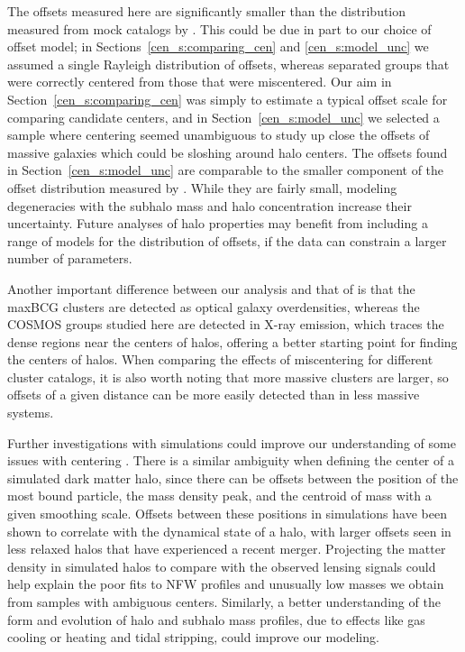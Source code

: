 The offsets measured here are significantly smaller than the
distribution measured from mock catalogs by
\citet{Johnston2007b}. This could be due in part to our choice of
offset model; in Sections~\ref{cen_s:comparing_cen} and \ref{cen_s:model_unc}
we assumed a single Rayleigh distribution of offsets, whereas
\citeauthor{Johnston2007b} separated groups that were correctly
centered from those that were miscentered. Our aim in
Section~\ref{cen_s:comparing_cen} was simply to estimate a typical offset
scale for comparing candidate centers, and in
Section~\ref{cen_s:model_unc} we selected a sample where centering seemed
unambiguous to study up close the offsets of massive galaxies which
could be sloshing around halo centers. The offsets found in
Section~\ref{cen_s:model_unc} are comparable to the smaller component of
the offset distribution measured by \citet{Oguri2010}. While they
are fairly small, modeling degeneracies with the subhalo mass and halo
concentration increase their uncertainty. Future analyses of halo
properties may benefit from including a range of models for the
distribution of offsets, if the data can constrain a larger number of
parameters.

Another important difference between our analysis and that of
\citeauthor{Johnston2007b} is that the maxBCG clusters are detected as
optical galaxy overdensities, whereas the COSMOS groups studied here
are detected in X-ray emission, which traces the dense regions near
the centers of halos, offering a better starting point for finding the
centers of halos. When comparing the effects of miscentering for
different cluster catalogs, it is also worth noting that more massive
clusters are larger, so offsets of a given distance can be more easily
detected than in less massive systems.

Further investigations with simulations could improve our understanding of some issues
with centering \citep[e.g.,][]{Maccio2007, Neto2007, Hilbert2010, Behroozi2011,
  Dietrich2012, Power2012}. There is a similar ambiguity when defining
the center of a simulated dark matter halo, since there can be offsets
between the position of the most bound particle, the mass density
peak, and the centroid of mass with a given smoothing scale. Offsets
between these positions in simulations have been shown to correlate
with the dynamical state of a halo, with larger offsets seen in less
relaxed halos that have experienced a recent merger. Projecting the
matter density in simulated halos to compare with the observed lensing
signals could help explain the poor fits to NFW profiles and unusually
low masses we obtain from samples with ambiguous centers. Similarly, a
better understanding of the form and evolution of halo and subhalo mass
profiles, due to effects like gas cooling or heating and tidal
stripping, could improve our modeling.

